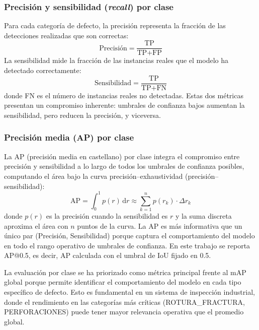 \subsubsection{Precisión y sensibilidad (\textit{recall}) por clase}

Para cada categoría de defecto, la precisión representa la fracción de las detecciones realizadas que son correctas:
\begin{equation}
\text{Precisión} = \frac{\text{TP}}{\text{TP} + \text{FP}}
\label{eq:precision}
\end{equation}
La sensibilidad mide la fracción de las instancias reales que el modelo ha detectado correctamente:
\begin{equation}
\text{Sensibilidad} = \frac{\text{TP}}{\text{TP} + \text{FN}}
\label{eq:recall}
\end{equation}
donde \acrshort{FN} es el número de instancias reales no detectadas. Estas dos métricas presentan un compromiso inherente: umbrales de confianza bajos aumentan la sensibilidad, pero reducen la precisión, y viceversa.

\subsubsection{Precisión media (AP) por clase}

La \acrfull{AP} (precisión media en castellano) por clase integra el compromiso entre precisión y sensibilidad a lo largo de todos los umbrales de confianza posibles, computando el área bajo la curva precisión--exhaustividad (precisión--sensibilidad):
\begin{equation}
\text{AP} = \int_0^1 p(r)\, \mathrm{d}r \approx \sum_{k=1}^{n} p(r_k) \cdot \Delta r_k
\label{eq:ap}
\end{equation}
donde $p(r)$ es la precisión cuando la sensibilidad es $r$ y la suma discreta aproxima el área con $n$ puntos de la curva. La AP es más informativa que un único par (Precisión, Sensibilidad) porque captura el comportamiento del modelo en todo el rango operativo de umbrales de confianza. En este trabajo se reporta AP@0.5, es decir, AP calculada con el umbral de IoU fijado en 0.5.

La evaluación por clase se ha priorizado como métrica principal frente al mAP global porque permite identificar el comportamiento del modelo en cada tipo específico de defecto. Esto es fundamental en un sistema de inspección industrial, donde el rendimiento en las categorías más críticas (\mbox{ROTURA\_FRACTURA}, PERFORACIONES) puede tener mayor relevancia operativa que el promedio global.

